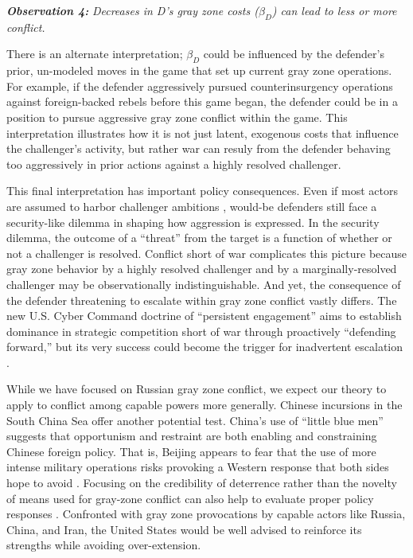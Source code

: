 \documentclass[bibtex, autowc]{apsr_submission}
\begin{document}
\textbf{\textit{Observation 4:}}\textit{ Decreases in D's gray zone costs ($\beta_{D}$) can lead to less or more conflict.}

There is an alternate interpretation; $\beta_{D}$ could be influenced by the defender's prior, un-modeled moves in the game that set up current gray zone operations. For example, if the defender aggressively pursued counterinsurgency operations against foreign-backed rebels before this game began, the defender could be in a position to pursue aggressive gray zone conflict within the game. This interpretation illustrates how it is not just latent, exogenous costs that influence the challenger's activity, but rather war can resuly from the defender behaving too aggressively in prior actions against a highly resolved challenger. 

This final interpretation has important policy consequences. Even if most actors are assumed to harbor challenger ambitions \citep{schweller_neorealismstatusquo_1996}, would-be defenders still face a security-like dilemma in shaping how aggression is expressed. In the security dilemma, the outcome of a ``threat'' from the target is a function of whether or not a challenger is resolved. Conflict short of war complicates this picture because gray zone behavior by a highly resolved challenger and by a marginally-resolved challenger may be observationally indistinguishable. And yet, the consequence of the defender threatening to escalate within gray zone conflict vastly differs. The new U.S. Cyber Command doctrine of ``persistent engagement'' aims to establish dominance in strategic competition short of war through proactively ``defending forward,'' but its very success could become the trigger for inadvertent escalation \citep{healey_escalationinversionother_2020}.

While we have focused on Russian gray zone conflict, we expect our theory to apply to conflict among capable powers more generally. Chinese incursions in the South China Sea offer another potential test. China’s use of ``little blue men'' suggests that opportunism and restraint are both enabling and constraining Chinese foreign policy. That is, Beijing appears to fear that the use of more intense military operations risks provoking a Western response that both sides hope to avoid \citep{zhang_cautiousbullyreputation_2019}. Focusing on the credibility of deterrence rather than the novelty of means used for gray-zone conflict can also help to evaluate proper policy responses \citep{green_counteringcoercionmaritime_2017}. Confronted with gray zone provocations by capable actors like Russia, China, and Iran, the United States would be well advised to reinforce its strengths while avoiding over-extension.
\end{document}
